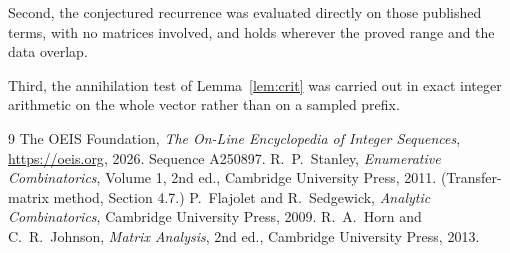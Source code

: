 \documentclass[11pt,a4paper]{article}
\theoremstyle{plain}
\theoremstyle{definition}
\begin{document}
Second, the conjectured recurrence was evaluated directly on those published terms, with no
matrices involved, and holds wherever the proved range and the data overlap.

Third, the annihilation test of Lemma~\ref{lem:crit} was carried out in exact integer
arithmetic on the whole vector rather than on a sampled prefix.

\begin{thebibliography}{9}
 The OEIS Foundation, \emph{The On-Line Encyclopedia of Integer
Sequences}, \url{https://oeis.org}, 2026. Sequence A250897.
 R.~P.~Stanley, \emph{Enumerative Combinatorics}, Volume 1, 2nd ed.,
Cambridge University Press, 2011. (Transfer-matrix method, Section 4.7.)
 P.~Flajolet and R.~Sedgewick, \emph{Analytic Combinatorics}, Cambridge
University Press, 2009.
 R.~A.~Horn and C.~R.~Johnson, \emph{Matrix Analysis}, 2nd ed., Cambridge
University Press, 2013.
\end{thebibliography}
\end{document}
